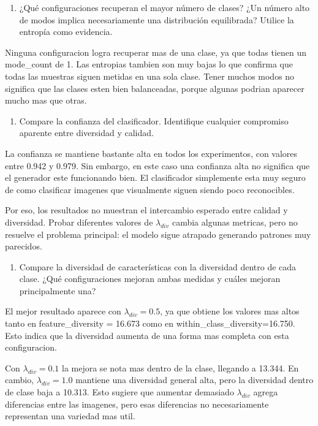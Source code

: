\documentclass[11pt,letterpaper]{article}
\newenvironment{responsebox}{\begin{tcolorbox}[colframe=black!50]}{\end{tcolorbox}}
\begin{document}
\begin{enumerate}[resume]
  \item ¿Qué configuraciones recuperan el mayor número de clases? ¿Un número
  alto de modos implica necesariamente una distribución equilibrada? Utilice
  la entropía como evidencia.
\end{enumerate}
\begin{responsebox}
Ninguna configuracion logra recuperar mas de una clase, ya que todas tienen un mode_count de 1. Las entropias tambien son muy bajas lo que confirma que todas las muestras siguen  metidas en una sola clase.
Tener muchos modos no significa que las clases esten bien balanceadas, porque algunas podrian aparecer mucho mas que otras.
\end{responsebox}


\begin{enumerate}[resume]
  \item Compare la confianza del clasificador. Identifique cualquier compromiso
  aparente entre diversidad y calidad.
\end{enumerate}
\begin{responsebox}
La confianza se mantiene bastante alta en todos los experimentos, con valores entre 0.942 y 0.979. Sin embargo, en este caso una confianza alta no significa que el generador este funcionando bien. El clasificador simplemente esta muy seguro de como clasificar imagenes que visualmente siguen siendo poco reconocibles.

Por eso, los resultados no muestran el intercambio esperado entre calidad y diversidad. Probar diferentes valores de $\lambda_{div}$ cambia algunas metricas, pero no resuelve el problema principal: el modelo sigue atrapado generando patrones muy parecidos.
\end{responsebox}

\begin{enumerate}[resume]
  \item Compare la diversidad de características con la diversidad dentro de
  cada clase. ¿Qué configuraciones mejoran ambas medidas y cuáles mejoran
  principalmente una?
\end{enumerate}
\begin{responsebox}
El mejor resultado aparece con $\lambda_{div}=0.5$, ya que obtiene los valores mas altos tanto en feature_diversity = 16.673 como en within_class_diversity=16.750. Esto indica que la diversidad aumenta de una forma mas completa con esta configuracion.

Con $\lambda_{div}=0.1$ la mejora se nota mas dentro de la clase, llegando a 13.344. En cambio, $\lambda_{div}=1.0$ mantiene una diversidad general alta, pero la diversidad dentro de clase baja a 10.313. Esto sugiere que aumentar demasiado $\lambda_{div}$ agrega diferencias entre las imagenes, pero esas diferencias no necesariamente representan una variedad mas util.
\end{responsebox}
\end{document}
